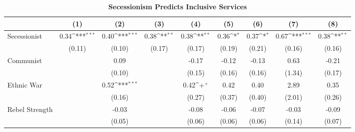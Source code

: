 \documentclass[12pt, letterpaper]{article}
\begin{document}
\begin{landscape}
\begin{table}[htbp]\centering
\begin{small}
\def\sym#1{\ifmmode^{#1}\else\(^{#1}\)\fi}
\makeatletter
\def\myrow{}
\CT@everycr{\noalign{%
\global\let\CT@row@color\relax
\stepcounter{mym1}%
\ifnum\value{mym1}=2
  \gdef\myrow{\rowcolor{gray!50}}
\else\ifnum\value{mym1}=4
  \gdef\myrow{}
\fi\fi
}\myrow}
\caption{\textbf{Secessionism Predicts Inclusive Services}}
\label{table:conditional}
\begin{tabular}{l*{8}{c}}
\hline\hline
                    &\multicolumn{1}{c}{(1)}&\multicolumn{1}{c}{(2)}&\multicolumn{1}{c}{(3)}&\multicolumn{1}{c}{(4)}&\multicolumn{1}{c}{(5)}&\multicolumn{1}{c}{(6)}&\multicolumn{1}{c}{(7)}&\multicolumn{1}{c}{(8)}\\
\hline
Secessionist      &        0.34\sym{***}&        0.40\sym{***}&        0.38\sym{**} &        0.38\sym{**} &        0.36\sym{*}  &        0.37\sym{*}  &        0.67\sym{***}&        0.38\sym{**} \\
                    &      (0.11)         &      (0.10)         &      (0.17)         &      (0.17)         &      (0.19)         &      (0.21)         &      (0.16)         &      (0.16)         \\
Communist           &                     &        0.09         &                     &       -0.17         &       -0.12         &       -0.13         &        0.63         &       -0.21         \\
                    &                     &      (0.10)         &                     &      (0.15)         &      (0.16)         &      (0.16)         &      (1.34)         &      (0.17)         \\
Ethnic War          &                     &        0.52\sym{***}&                     &        0.42\sym{+}  &        0.42         &        0.40         &        2.89         &        0.35         \\
                    &                     &      (0.16)         &                     &      (0.27)         &      (0.37)         &      (0.40)         &      (2.01)         &      (0.26)         \\
Rebel Strength      &                     &       -0.03         &                     &       -0.08         &       -0.06         &       -0.07         &       -0.03         &       -0.09         \\
                    &                     &      (0.05)         &                     &      (0.06)         &      (0.06)         &      (0.06)         &      (0.14)         &      (0.07)         \\

\end{tabular}
\end{small}
\end{table}
\end{landscape}
\end{document}
